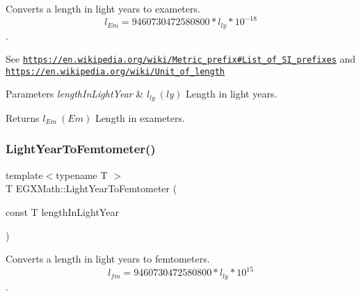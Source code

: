 Converts a length in light years to exameters. \[ l_{Em}=9460730472580800 * l_{ly} * 10^{-18} \]. 

See \href{https://en.wikipedia.org/wiki/Metric_prefix#List_of_SI_prefixes}{\tt https\+://en.\+wikipedia.\+org/wiki/\+Metric\+\_\+prefix\#\+List\+\_\+of\+\_\+\+S\+I\+\_\+prefixes} and \href{https://en.wikipedia.org/wiki/Unit_of_length}{\tt https\+://en.\+wikipedia.\+org/wiki/\+Unit\+\_\+of\+\_\+length} 
\begin{DoxyParams}{Parameters}
{\em length\+In\+Light\+Year} & $ l_{ly}\ (ly)$ Length in light years. \\
\hline
\end{DoxyParams}
\begin{DoxyReturn}{Returns}
$ l_{Em}\ (Em)$ Length in exameters. 
\end{DoxyReturn}
\mbox{\label{group___e_g_x_math-_conversions-_length_conversions-_astronomical-_light_year-_s_i_ga5b812ad19216d3cf0e9da61009445cbf}} 
\subsubsection{\texorpdfstring{Light\+Year\+To\+Femtometer()}{LightYearToFemtometer()}}
{\footnotesize\ttfamily template$<$typename T $>$ \\
T E\+G\+X\+Math\+::\+Light\+Year\+To\+Femtometer (\begin{DoxyParamCaption}\item[{const T}]{length\+In\+Light\+Year }\end{DoxyParamCaption})}



Converts a length in light years to femtometers. \[ l_{fm}=9460730472580800 * l_{ly} * 10^{15} \]. 


